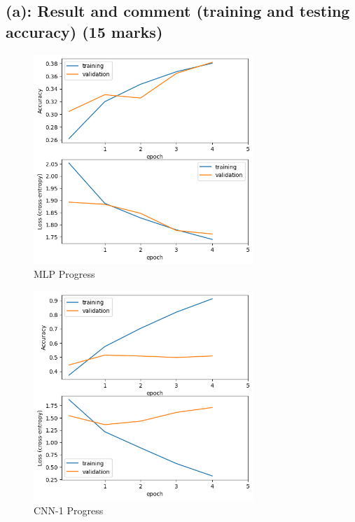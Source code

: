 \documentclass{tron}
\begin{document}

\subsection{(a): Result and comment (training and testing accuracy) (15 marks)}
\begin{figure}[H]
	\center
	\includegraphics[height=300px]{../src_code/output/p3/progress_MLP.}
	\caption{MLP Progress}
\end{figure}
\begin{figure}[H]
	\center
	\includegraphics[height=300px]{../src_code/output/p3/progress_CNN-1.}
	\caption{CNN-1 Progress}
\end{figure}
\end{document}
